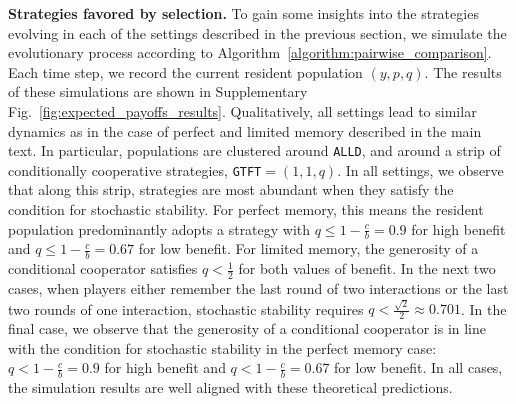 \documentclass[11pt]{article}
\def\alld{\texttt{ALLD}}
\def\gtft{\texttt{GTFT}}
\theoremstyle{plainCl1}
\theoremstyle{plainCl2}
\begin{document}
{\bf Strategies favored by selection.} 
To gain some insights into the strategies evolving in each of the settings described in the previous section, we simulate the evolutionary process according to Algorithm~\ref{algorithm:pairwise_comparison}. 
Each time step, we record the current resident population \((y, p, q)\). 
The results of these simulations are shown in Supplementary Fig.~\ref{fig:expected_payoffs_results}. 
Qualitatively, all settings lead to similar dynamics as in the case of perfect and limited memory described in the main text. 
In particular, populations are clustered around \alld, and around a strip of conditionally cooperative strategies, \gtft$=\!(1,1,q)$. 
In all settings, we observe that along this strip, strategies are most abundant when they satisfy the condition for stochastic stability. 
For perfect memory, this means the resident population predominantly adopts a
strategy with \(q \leq 1 - \frac{c}{b} = 0.9\) for high benefit and \(q \leq 1 -
\frac{c}{b} = 0.67\) for low benefit.
For limited memory, the generosity of a conditional cooperator satisfies \(q <
\frac{1}{2}\) for both values of benefit.
In the next two cases, when players either remember the last round of two
interactions or the last two rounds of one interaction, stochastic stability
requires \(q < \frac{\sqrt{2}}{2} \approx 0.701\).
In the final case, we observe that the generosity of a conditional cooperator is
in line with the condition for stochastic stability in the perfect memory case:
\(q < 1 - \frac{c}{b} = 0.9\) for high benefit and \(q < 1 - \frac{c}{b} =
0.67\) for low benefit.
In all cases, the simulation results are well aligned with these theoretical predictions.\\


\end{document}
